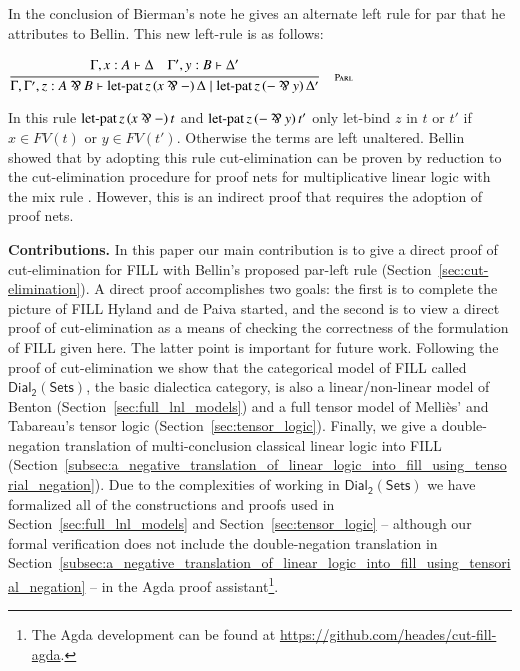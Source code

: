 \documentclass{elsarticle}
\newcommand{\FILLdrule}[4][]{{\displaystyle\frac{\begin{array}{l}#2\end{array}}{#3}\quad\FILLdrulename{#4}}}
\newcommand{\FILLpremise}[1]{ #1 \\}
\newcommand{\FILLnt}[1]{\mathit{#1}}
\newcommand{\FILLmv}[1]{\mathit{#1}}
\newcommand{\FILLsym}[1]{#1}
\newcommand{\FILLdrulename}[1]{\textsc{#1}}
\newcommand{\FILLdruleParl}[1]{\FILLdrule[#1]{%
\FILLpremise{  \Gamma  \FILLsym{,}  \FILLmv{x}  \FILLsym{:}  \FILLnt{A}  \vdash  \Delta   \quad   \Gamma'  \FILLsym{,}  \FILLmv{y}  \FILLsym{:}  \FILLnt{B}  \vdash  \Delta'  }%
}{
 \Gamma  \FILLsym{,}  \Gamma'  \FILLsym{,}  \FILLmv{z}  \FILLsym{:}   \FILLnt{A}  \parr  \FILLnt{B}   \vdash     \mathsf{\operatorname{let-pat} }\, \FILLmv{z} \, \FILLsym{(}   \FILLmv{x}  \parr   -    \FILLsym{)} \, \Delta    \mid    \mathsf{\operatorname{let-pat} }\, \FILLmv{z} \, \FILLsym{(}    -   \parr  \FILLmv{y}   \FILLsym{)} \, \Delta'    }{%
{\FILLdrulename{Parl}}{}%
}}
\renewcommand{\FILLdrulename}[1]{\scriptsize \textsc{#1}}
\newcommand{\dial}[0]{\mathsf{Dial_2}(\mathsf{Sets})}
\begin{document}
In the conclusion of Bierman's note he gives an alternate left rule
for par that he attributes to Bellin.  This new left-rule is as
follows:
\begin{center}
  \begin{math}
    \FILLdruleParl{}
  \end{math}
\end{center}
In this rule $ \mathsf{\operatorname{let-pat} }\, \FILLmv{z} \, \FILLsym{(}   \FILLmv{x}  \parr   -    \FILLsym{)} \, \FILLnt{t} $ and $ \mathsf{\operatorname{let-pat} }\, \FILLmv{z} \, \FILLsym{(}    -   \parr  \FILLmv{y}   \FILLsym{)} \, \FILLnt{t'} $ only let-bind $z$ in $t$ or $t'$ if $x \in FV(t)$ or $y \in
FV(t')$.  Otherwise the terms are left unaltered.  Bellin showed that
by adopting this rule cut-elimination can be proven by reduction to
the cut-elimination procedure for proof nets for multiplicative linear
logic with the mix rule \cite{Bellin:1997}.  However, this is an
indirect proof that requires the adoption of proof nets.

\textbf{Contributions.} In this paper our main contribution is to give
a direct proof of cut-elimination for FILL with Bellin's proposed
par-left rule (Section~\ref{sec:cut-elimination}).  A direct proof
accomplishes two goals: the first is to complete the picture of FILL
Hyland and de Paiva started, and the second is to view a direct proof
of cut-elimination as a means of checking the correctness of the
formulation of FILL given here.  The latter point is important for
future work.  Following the proof of cut-elimination we show that the
categorical model of FILL called $\dial$, the basic dialectica
category, is also a linear/non-linear model of Benton
(Section~\ref{sec:full_lnl_models}) and a full tensor model of
Melli\`es' and Tabareau's tensor logic
(Section~\ref{sec:tensor_logic}). Finally, we give a double-negation
translation of multi-conclusion classical linear logic into FILL
(Section~\ref{subsec:a_negative_translation_of_linear_logic_into_fill_using_tensorial_negation}).
Due to the complexities of working in $\dial$ we have formalized all
of the constructions and proofs used in
Section~\ref{sec:full_lnl_models} and Section~\ref{sec:tensor_logic}
-- although our formal verification does not include the
double-negation translation in
Section~\ref{subsec:a_negative_translation_of_linear_logic_into_fill_using_tensorial_negation}
-- in the Agda proof assistant\footnote{The Agda development can be
  found at \url{https://github.com/heades/cut-fill-agda}.}.
\end{document}
